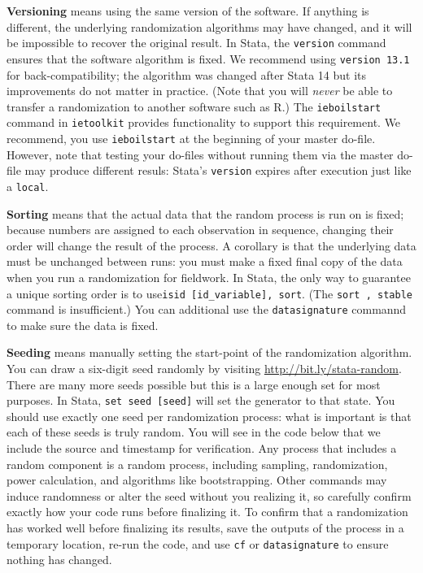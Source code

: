 \textbf{Versioning} means using the same version of the software.
If anything is different, the underlying randomization algorithms may have changed,
and it will be impossible to recover the original result.
In Stata, the \texttt{version} command ensures that the software algorithm is fixed.
We recommend using \texttt{version 13.1} for back-compatibility;
the algorithm was changed after Stata 14 but its improvements do not matter in practice.
(Note that you will \textit{never} be able to transfer a randomization to another software such as R.)
The \texttt{ieboilstart} command in \texttt{ietoolkit} provides functionality to support this requirement.
We recommend, you use \texttt{ieboilstart} at the beginning of your master do-file.
However, note that testing your do-files without running them
via the master do-file may produce different resuls:
Stata's \texttt{version} expires after execution just like a \texttt{local}.

\textbf{Sorting} means that the actual data that the random process is run on is fixed;
because numbers are assigned to each observation in sequence,
changing their order will change the result of the process.
A corollary is that the underlying data must be unchanged between runs:
you must make a fixed final copy of the data when you run a randomization for fieldwork.
In Stata, the only way to guarantee a unique sorting order is to use\texttt{isid [id\_variable], sort}. (The \texttt{sort , stable} command is insufficient.)
You can additional use the \texttt{datasignature} commannd to make sure the data is fixed.

\textbf{Seeding} means manually setting the start-point of the randomization algorithm.
You can draw a six-digit seed randomly by visiting \url{http://bit.ly/stata-random}.
There are many more seeds possible but this is a large enough set for most purposes.
In Stata, \texttt{set seed [seed]} will set the generator to that state.
You should use exactly one seed per randomization process:
what is important is that each of these seeds is truly random.
You will see in the code below that we include the source and timestamp for verification.
Any process that includes a random component is a random process,
including sampling, randomization, power calculation, and algorithms like bootstrapping.
Other commands may induce randomness or alter the seed without you realizing it,
so carefully confirm exactly how your code runs before finalizing it.
To confirm that a randomization has worked well before finalizing its results,
save the outputs of the process in a temporary location,
re-run the code, and use \texttt{cf} or \texttt{datasignature} to ensure nothing has changed.

